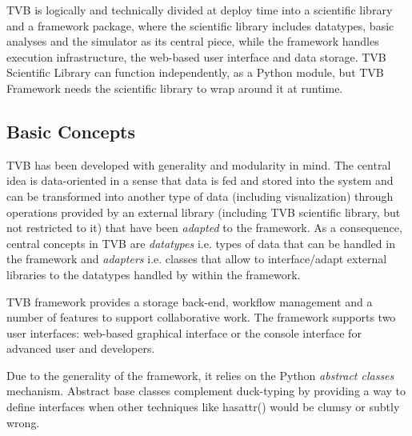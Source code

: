 TVB is logically and technically divided at deploy time into a scientific
library and a framework package, where the scientific library includes
datatypes, basic analyses and the simulator as its central piece, while the
framework handles execution infrastructure, the web-based user interface and
data storage.  TVB Scientific Library can function independently, as a Python
module, but TVB Framework needs the scientific library to wrap around it at
runtime. 


\subsection{Basic Concepts}

TVB has been developed with generality and modularity in mind. The central idea is data-oriented in a sense that
data is fed and stored into the system and can be transformed into another type
of data (including visualization) through operations provided by an external
library (including TVB scientific library, but not restricted to it) that have
been \emph{adapted} to the framework. As a consequence, central concepts in TVB
are \emph{datatypes} i.e. types of data that can be handled in the framework and
\emph{adapters} i.e. classes that allow to interface/adapt external libraries
to  the datatypes handled by within the framework.

TVB framework provides a storage back-end, workflow management and a number of features to
support collaborative work. The framework supports two user interfaces: web-based graphical interface or the
console interface for advanced user and developers.

Due to the generality of the framework, it relies on the Python \emph{abstract classes} mechanism.
Abstract base classes complement duck-typing by providing a way to define
interfaces when other techniques like hasattr() would be clumsy or subtly wrong.
   
%
%
%
%
%
%


